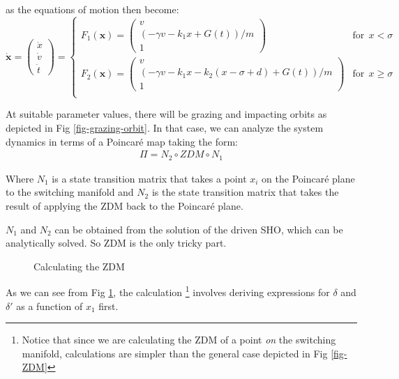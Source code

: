 \documentclass{book}
\renewcommand{\(}{\begin{columns}}
\renewcommand{\)}{\end{columns}}
\newcommand{\<}[1]{\begin{column}{#1}}
\renewcommand{\>}{\end{column}}
\newcommand{\mb}[1]{\mathbf{#1}}
\begin{document}
as the equations of motion then become:
\begin{equation}
\label{eq-softimp-3d}
\dot{\mb{x}}=
\begin{pmatrix}
\dot{x}\\
\dot{v}\\
\dot{t}
\end{pmatrix}
=
\begin{cases}
F_1(\mb{x})=
\begin{pmatrix}
v\\
(-\gamma v-k_1x+G(t))/m\\
1
\end{pmatrix}&\mathrm{for}~~x<\sigma\\
F_2(\mb{x})=
\begin{pmatrix}
v\\
(-\gamma v-k_1x-k_2(x-\sigma+d)+G(t))/m\\
1
\end{pmatrix}&\mathrm{for}~~x\geq\sigma\\
\end{cases}
\end{equation}

At suitable parameter values, there will be grazing and impacting orbits as 
depicted in Fig \ref{fig-grazing-orbit}. In that case, we can analyze the system 
dynamics in terms of a Poincaré map taking the form:
\begin{align}
\label{eq-pmap-composed}
\Pi=N_2\circ ZDM\circ N_1
\end{align}

Where $N_1$ is a state transition matrix that takes a point $x_i$ on the 
Poincaré plane to the switching manifold and $N_2$ is the state transition 
matrix that takes  the result of applying the ZDM back to the Poincaré plane.  

$N_1$ and $N_2$ can be obtained from the solution of the driven SHO, which can 
be analytically solved.  So ZDM is the only tricky part. 


\begin{figure}[!htp]
\centering
\caption{Calculating the ZDM}
\label{fig-ZDM-calc}
\def\svgwidth{0.6\columnwidth}

\end{figure}


As we can see  from Fig \ref{fig-ZDM-calc}, the calculation \footnote{Notice that since we are calculating 
the ZDM of a point \emph{on} the switching manifold, calculations are simpler than the general case depicted in Fig \ref{fig-ZDM}} 
involves deriving expressions for $\delta$ and $\delta'$ as a function of $x_1$ 
first.   
\end{document}
